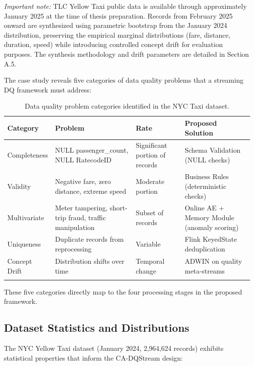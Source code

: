 \textit{Important note:} TLC Yellow Taxi public data is available through approximately January 2025 at the time of thesis preparation. Records from February 2025 onward are synthesized using parametric bootstrap from the January 2024 distribution, preserving the empirical marginal distributions (fare, distance, duration, speed) while introducing controlled concept drift for evaluation purposes. The synthesis methodology and drift parameters are detailed in Section A.5.

The case study reveals five categories of data quality problems that a streaming DQ framework must address:

\begin{longtable}{|m{2.2cm}|m{3.5cm}|m{2.5cm}|m{4.5cm}|}
\hline
\textbf{Category} & \textbf{Problem} & \textbf{Rate} & \textbf{Proposed Solution} \\ \hline
Completeness & NULL passenger\_count, NULL RatecodeID & Significant portion of records & Schema Validation (NULL checks) \\ \hline
Validity & Negative fare, zero distance, extreme speed & Moderate portion & Business Rules (deterministic checks) \\ \hline
Multivariate & Meter tampering, short-trip fraud, traffic manipulation & Subset of records & Online AE + Memory Module (anomaly scoring) \\ \hline
Uniqueness & Duplicate records from reprocessing & Variable & Flink KeyedState deduplication \\ \hline
Concept Drift & Distribution shifts over time & Temporal change & ADWIN on quality meta-streams \\ \hline
\caption{Data quality problem categories identified in the NYC Taxi dataset.}
\label{tab:dq_categories}
\end{longtable}

These five categories directly map to the four processing stages in the proposed framework.

\subsection{Dataset Statistics and Distributions}

The NYC Yellow Taxi dataset (January 2024, 2,964,624 records) exhibits statistical properties that inform the CA-DQStream design:

